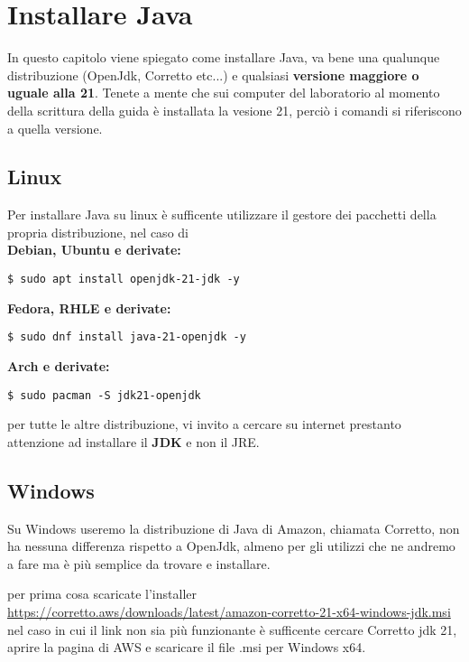 \section{Installare Java}

    In questo capitolo viene spiegato come installare Java, va bene una qualunque distribuzione (OpenJdk, Corretto etc...) e qualsiasi \textbf{versione maggiore o uguale alla 21}. Tenete a mente 
    che sui computer del laboratorio al momento della scrittura della guida è installata la vesione 21, perciò i comandi si riferiscono a quella versione.

    \subsection{Linux}
        Per installare Java su linux è sufficente utilizzare il gestore dei pacchetti della propria distribuzione, nel caso di\\
        \textbf{Debian, Ubuntu e derivate:}
        \begin{ret}
            \texttt{\$ sudo apt install openjdk-21-jdk -y}
        \end{ret}
        
        \textbf{Fedora, RHLE e derivate:}
        \begin{ret}
            \texttt{\$ sudo dnf install java-21-openjdk -y}
        \end{ret}

        \textbf{Arch e derivate:}
        \begin{ret}
            \texttt{\$ sudo pacman -S jdk21-openjdk}
        \end{ret}
        per tutte le altre distribuzione, vi invito a cercare su internet prestanto attenzione ad installare il \textbf{JDK} e non il JRE.
    
    \subsection{Windows}
        Su Windows useremo la distribuzione di Java di Amazon, chiamata Corretto, non ha nessuna differenza rispetto a OpenJdk, almeno per gli utilizzi che ne andremo a fare
        ma è più semplice da trovare e installare.

        per prima cosa scaricate l'installer \url{https://corretto.aws/downloads/latest/amazon-corretto-21-x64-windows-jdk.msi}\\
        nel caso in cui il link non sia più funzionante è sufficente cercare Corretto jdk 21, aprire la pagina di AWS e scaricare il file .msi per Windows x64.
    
